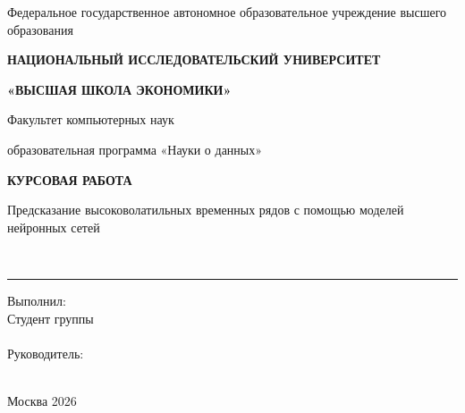 \documentclass[12pt,a4paper]{report}
\begin{document}

\begin{titlepage}
    \centering
    \onehalfspacing

    {\small Федеральное государственное автономное образовательное учреждение высшего образования\par}
    \vspace{1em}
    {\bfseries\MakeUppercase{НАЦИОНАЛЬНЫЙ ИССЛЕДОВАТЕЛЬСКИЙ УНИВЕРСИТЕТ}\par}
    {\bfseries\MakeUppercase{«ВЫСШАЯ ШКОЛА ЭКОНОМИКИ»}\par}
    \vspace{1em}
    {\small Факультет компьютерных наук\par}
    {\small образовательная программа «Науки о данных»\par}

    \vfill

    {\Large\bfseries КУРСОВАЯ РАБОТА\par}
    \vspace{2em}

\begin{center}
 \bfseries            %
  \parbox{0.9\textwidth}{\centering
    Предсказание высоковолатильных временных рядов с помощью моделей нейронных сетей}%
  \\[0.8ex]                  %
  \rule{0.9\textwidth}{0.4pt}%
\end{center}
\vspace{1em}


    \vfill

    \begin{flushright}
    Выполнил:\\
    Студент группы \underline{}\\[0.5em]
    \underline{}\\[2em]

    Руководитель:\\[0.5em]
    \underline{}\\
    \underline{}

    \end{flushright}

    \vfill

    {\centering Москва 2026\par}

\end{titlepage}
\tableofcontents
\end{document}
